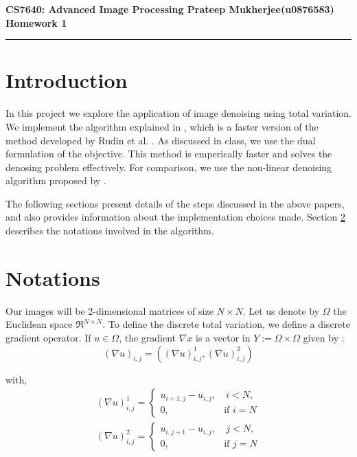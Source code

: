 \documentclass[11pt]{article}
\begin{document}
\thispagestyle{empty}
{\large{\bf CS7640: Advanced Image Processing \hfill Prateep Mukherjee(u0876583)}}\\

{\LARGE{\bf Homework 1}}
\vspace{0.2\baselineskip}
\hrule

\section{Introduction}
\label{sec1}

\par In this project we explore the application of image denoising using total variation. We implement the algorithm explained in \cite{Chambolle}, which is a faster version of the method developed by Rudin et al. \cite{Rudin}. As discussed in class, we use the dual formulation of the objective. This method is emperically faster and solves the denosing problem effectively. For comparison, we use the non-linear denoising algorithm proposed by \cite{Malik}. 

\par The following sections present details of the steps discussed in the above papers, and also provides information about the implementation choices made. Section \ref{sec2} describes the notations involved in the algorithm. 

\section{Notations}
\label{sec2}

Our images will be 2-dimensional matrices of size $N \times N$. Let us denote by $\Omega$ the Euclidean space $\Re^{N \times N}$. To define the discrete total variation, we define a discrete gradient operator. If $u \in \Omega$, the gradient $\nabla x$ is a vector in $Y := \Omega \times \Omega$ given by :
\vspace{-5pt}
\begin{equation*}
  (\nabla u)_{i,j} = ( (\nabla u)^{1}_{i,j}, (\nabla u)^{2}_{i,j}) 
\end{equation*}

with,
\vspace{-5pt}
\begin{eqnarray*} 
	(\nabla u)^{1}_{i,j} = 
	\begin{cases}
		u_{i+1,j} - u_{i,j}, & \ \mbox{$i < N$}, \\
		0, & \mbox{if $i = N$}
	\end{cases} \\
	(\nabla u)^{2}_{i,j} = 
	\begin{cases}
		u_{i,j+1} - u_{i,j}, & \ \mbox{$j < N$}, \\
		0, & \mbox{if $j = N$}
	\end{cases}
\end{eqnarray*}
\end{document}
